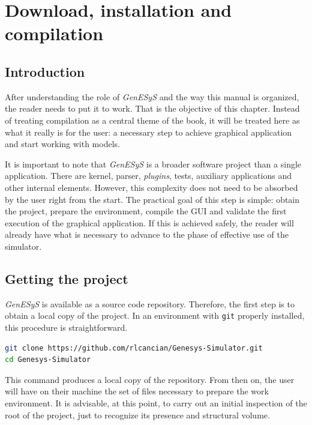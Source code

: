 \chapter{Download, installation and compilation}
\label{chap:download_instalacao_compilacao}

\section{Introduction}
\label{sec:cap2_introducao}

After understanding the role of \textit{GenESyS} and the way this manual is organized, the reader needs to put it to work. That is the objective of this chapter. Instead of treating compilation as a central theme of the book, it will be treated here as what it really is for the user: a necessary step to achieve graphical application and start working with models.

It is important to note that \textit{GenESyS} is a broader software project than a single application. There are kernel, parser, \textit{plugins}, tests, auxiliary applications and other internal elements. However, this complexity does not need to be absorbed by the user right from the start. The practical goal of this step is simple: obtain the project, prepare the environment, compile the GUI and validate the first execution of the graphical application. If this is achieved safely, the reader will already have what is necessary to advance to the phase of effective use of the simulator.

\section{Getting the project}
\label{sec:cap2_obtendo_projeto}

\textit{GenESyS} is available as a source code repository. Therefore, the first step is to obtain a local copy of the project. In an environment with \texttt{git} properly installed, this procedure is straightforward.

\begin{lstlisting}[language=bash,caption={Initial Clone of the GenESyS Repository},label={lst:cap2_git_clone}]
git clone https://github.com/rlcancian/Genesys-Simulator.git
cd Genesys-Simulator
\end{lstlisting}

This command produces a local copy of the repository. From then on, the user will have on their machine the set of files necessary to prepare the work environment. It is advisable, at this point, to carry out an initial inspection of the root of the project, just to recognize its presence and structural volume.

